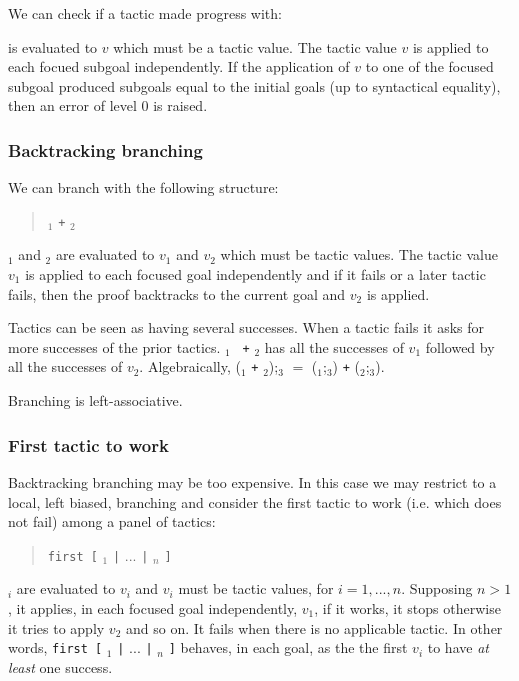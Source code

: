 We can check if a tactic made progress with:
\begin{quote}
{}
\end{quote}
{\tacexpr} is evaluated to $v$ which must be a tactic value.
The tactic value $v$ is
applied to each focued subgoal independently. If the application of
$v$ to one of the focused subgoal produced subgoals equal to the
initial goals (up to syntactical equality), then an error of level 0
is raised.

\ErrMsg {}

\subsubsection[Backtracking branching]{Backtracking branching\tacindex{$+$}
}

We can branch with the following structure:
\begin{quote}
{\tacexpr}$_1$ {\tt +} {\tacexpr}$_2$
\end{quote}
{\tacexpr}$_1$ and {\tacexpr}$_2$ are evaluated to $v_1$ and
$v_2$ which must be tactic values. The tactic value $v_1$ is applied to each
focused goal independently and if it fails or a later tactic fails,
then the proof backtracks to the current goal and $v_2$ is applied.

Tactics can be seen as having several successes. When a tactic fails
it asks for more successes of the prior tactics. {\tacexpr}$_1$ {\tt
  +} {\tacexpr}$_2$ has all the successes of $v_1$ followed by all the
successes of $v_2$. Algebraically, ({\tacexpr}$_1$ {\tt +}
{\tacexpr}$_2$);{\tacexpr}$_3$ $=$ ({\tacexpr}$_1$;{\tacexpr}$_3$)
{\tt +} ({\tacexpr}$_2$;{\tacexpr}$_3$).

Branching is left-associative.

\subsubsection[First tactic to work]{First tactic to work
}

Backtracking branching may be too expensive. In this case we may
restrict to a local, left biased, branching and consider the first
tactic to work (i.e. which does not fail) among a panel of tactics:
\begin{quote}
{\tt first [} {\tacexpr}$_1$ {\tt |} $...$ {\tt |} {\tacexpr}$_n$ {\tt ]}
\end{quote}
{\tacexpr}$_i$ are evaluated to $v_i$ and $v_i$ must be tactic values,
for $i=1,...,n$. Supposing $n>1$, it applies, in each focused goal
independently, $v_1$, if it works, it stops otherwise it tries to
apply $v_2$ and so on. It fails when there is no applicable tactic. In
other words, {\tt first [} {\tacexpr}$_1$ {\tt |} $...$ {\tt |}
  {\tacexpr}$_n$ {\tt ]} behaves, in each goal, as the the first $v_i$
to have \emph{at least} one success.

